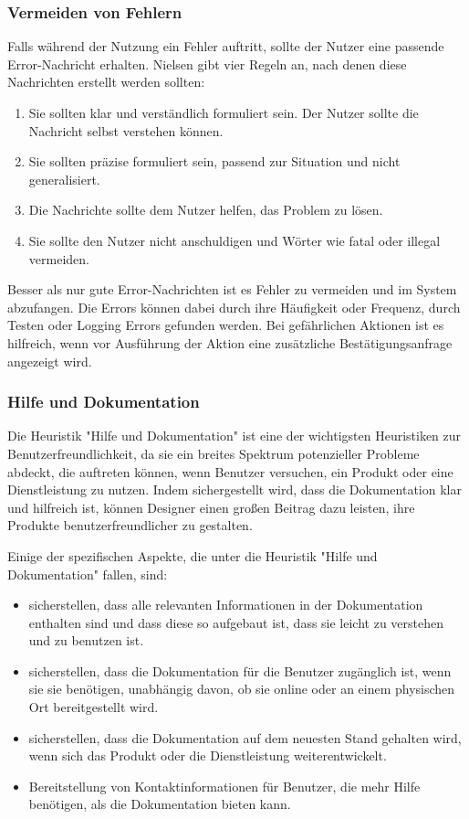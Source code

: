 \documentclass[utf8,biblatex]{lni}
\begin{document}
\subsubsection{Vermeiden von Fehlern}
Falls während der Nutzung ein Fehler auftritt, sollte der Nutzer eine passende Error-Nachricht erhalten. Nielsen gibt vier Regeln an, nach denen diese Nachrichten erstellt werden sollten:
\begin{enumerate}
  \item Sie sollten klar und verständlich formuliert sein. Der Nutzer sollte die Nachricht selbst verstehen können.
  \item Sie sollten präzise formuliert sein, passend zur Situation und nicht generalisiert.
  \item Die Nachrichte sollte dem Nutzer helfen, das Problem zu lösen.
  \item Sie sollte den Nutzer nicht anschuldigen und Wörter wie fatal oder illegal vermeiden.
\end{enumerate}

Besser als nur gute Error-Nachrichten ist es Fehler zu vermeiden und im System abzufangen. Die Errors können dabei durch ihre Häufigkeit oder Frequenz, durch Testen oder Logging Errors gefunden werden. Bei gefährlichen Aktionen ist es hilfreich, wenn vor Ausführung der Aktion eine zusätzliche Bestätigungsanfrage angezeigt wird. 


\subsubsection{Hilfe und Dokumentation}
Die Heuristik "Hilfe und Dokumentation" ist eine der wichtigsten Heuristiken zur Benutzerfreundlichkeit, da sie ein breites Spektrum potenzieller Probleme abdeckt, die auftreten können, wenn Benutzer versuchen, ein Produkt oder eine Dienstleistung zu nutzen. Indem sichergestellt wird, dass die Dokumentation klar und hilfreich ist, können Designer einen großen Beitrag dazu leisten, ihre Produkte benutzerfreundlicher zu gestalten.

Einige der spezifischen Aspekte, die unter die Heuristik "Hilfe und Dokumentation" fallen, sind:
\begin{itemize}
  \item sicherstellen, dass alle relevanten Informationen in der Dokumentation enthalten sind und dass diese so aufgebaut ist, dass sie leicht zu verstehen und zu benutzen ist.
  \item sicherstellen, dass die Dokumentation für die Benutzer zugänglich ist, wenn sie sie benötigen, unabhängig davon, ob sie online oder an einem physischen Ort bereitgestellt wird.
  \item sicherstellen, dass die Dokumentation auf dem neuesten Stand gehalten wird, wenn sich das Produkt oder die Dienstleistung weiterentwickelt.
  \item Bereitstellung von Kontaktinformationen für Benutzer, die mehr Hilfe benötigen, als die Dokumentation bieten kann.
\end{itemize}
\end{document}
